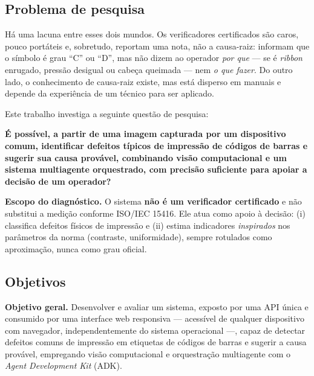 \documentclass[
	article,			%
	11pt,				%
	oneside,			%
	a4paper,			%
	english,			%
	brazilian,			%
	sumario=tradicional
	]{abntex2}
\begin{document}
\subsection{Problema de pesquisa}

Há uma lacuna entre esses dois mundos. Os verificadores certificados são caros,
pouco portáteis e, sobretudo, reportam uma nota, não a causa-raiz: informam que o
símbolo é grau ``C'' ou ``D'', mas não dizem ao operador \textit{por que} --- se
é \textit{ribbon} enrugado, pressão desigual ou cabeça queimada --- nem \textit{o
que fazer}. Do outro lado, o conhecimento de causa-raiz existe, mas está disperso
em manuais e depende da experiência de um técnico para ser aplicado.

Este trabalho investiga a seguinte questão de pesquisa:

\begin{citacao}
\noindent\textbf{É possível, a partir de uma imagem capturada por um dispositivo
comum, identificar defeitos típicos de impressão de códigos de barras e sugerir
sua causa provável, combinando visão computacional e um sistema multiagente
orquestrado, com precisão suficiente para apoiar a decisão de um operador?}
\end{citacao}

\noindent\textbf{Escopo do diagnóstico.} O sistema \textbf{não é um verificador
certificado} e não substitui a medição conforme ISO/IEC 15416. Ele atua como
apoio à decisão: (i) classifica defeitos físicos de impressão e (ii) estima
indicadores \textit{inspirados} nos parâmetros da norma (contraste,
uniformidade), sempre rotulados como aproximação, nunca como grau oficial.

\subsection{Objetivos}

\noindent\textbf{Objetivo geral.} Desenvolver e avaliar um sistema, exposto por
uma API única e consumido por uma interface web responsiva --- acessível de
qualquer dispositivo com navegador, independentemente do sistema operacional ---,
capaz de detectar defeitos comuns de impressão em etiquetas de códigos de barras
e sugerir a causa provável, empregando visão computacional e orquestração
multiagente com o \textit{Agent Development Kit} (ADK).
\end{document}

